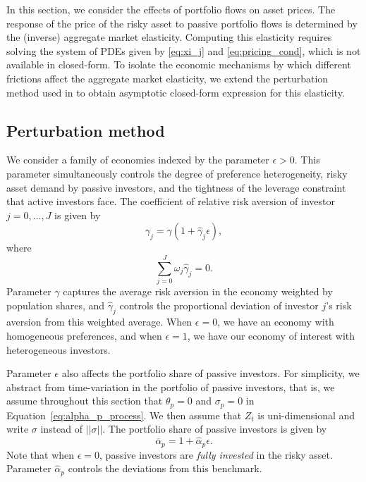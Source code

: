 In this section, we consider the effects of portfolio flows on asset prices. The response of the price of the risky asset to passive portfolio flows is determined by the (inverse) aggregate market elasticity. Computing this elasticity requires solving the system of PDEs given by \eqref{eq:xi_j} and \eqref{eq:pricing_cond}, which is not available in closed-form. To isolate the economic mechanisms by which different frictions affect the aggregate market elasticity, we extend the perturbation method used in \citet{Silva/riskchannel} to obtain asymptotic closed-form expression for this elasticity. 

\subsection{Perturbation method}

We consider a family of economies indexed by the parameter $\epsilon > 0$. This parameter simultaneously controls the degree of preference heterogeneity, 
risky asset demand by passive investors,
and the tightness of the leverage constraint that active investors face. The coefficient of relative risk aversion of investor $j=0,\ldots, J$ is given by 
\begin{equation}\label{eq:gamma-perturb}
    \gamma_j = \gamma ( 1 + \hat{\gamma}_j \epsilon),
\end{equation}
where 
\begin{equation*}
    \sum_{j=0}^J \omega_j \hat{\gamma}_j = 0. 
\end{equation*}
Parameter $\gamma$ captures the average risk aversion in the economy weighted by population shares, and $\hat{\gamma}_j$ controls the proportional deviation of investor $j$'s risk aversion from this weighted average. When $\epsilon = 0$, we have an economy with homogeneous preferences, and when $\epsilon = 1$, we have our economy of interest with heterogeneous investors. 

Parameter $\epsilon$ also affects the portfolio share of passive investors. For simplicity, we abstract from time-variation in the portfolio of passive investors, that is, we assume throughout this section that $\theta_p = 0 $ and $\sigma_p = 0$ in Equation~\eqref{eq:alpha_p_process}. 
We then assume that $Z_t$ is uni-dimensional and write $\sigma$ instead of $||\sigma||$.
The portfolio share of passive investors is given by 
\begin{equation}\label{eq:apbar_index}
    \overline{\alpha}_p = 1 + \hat{\alpha}_p \epsilon.
\end{equation}
Note that when $\epsilon = 0$, passive investors are \textit{fully invested} in the risky asset. Parameter $\hat{\alpha}_p$ controls the deviations from this benchmark. 


